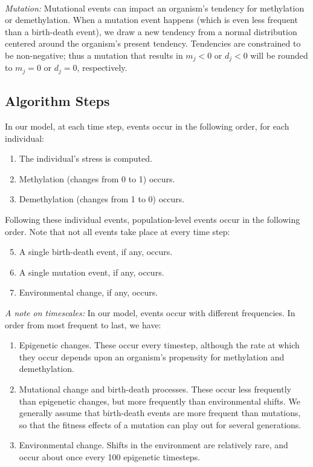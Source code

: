 \documentclass{article}
\begin{document}
\ 

\noindent \textit{Mutation:} Mutational events can impact an organism's tendency for methylation or demethylation. When a mutation event happens (which is even less frequent than a birth-death event), we draw a new tendency from a normal distribution centered around the organism's present tendency. Tendencies are constrained to be non-negative; thus a mutation that results in $m_j<0$ or $d_j<0$ will be rounded to $m_j=0$ or $d_j=0$, respectively.


\subsection{Algorithm Steps}
In our model, at each time step, events occur in the following order, for each individual:
\begin{enumerate}
    \item The individual's stress is computed.
    \item Methylation (changes from 0 to 1) occurs.
    \item Demethylation (changes from 1 to 0) occurs.
\end{enumerate}

Following these individual events, population-level events occur in the following order. Note that not all events take place at every time step:
\begin{enumerate}
  \setcounter{enumi}{4}
    \item A single birth-death event, if any, occurs.
    \item A single mutation event, if any, occurs.
    \item Environmental change, if any, occurs.
\end{enumerate}

\textit{A note on timescales:} In our model, events occur with different frequencies. In order from most frequent to last, we have:
\begin{enumerate}
    \item Epigenetic changes. These occur every timestep, although the rate at which they occur depends upon an organism's propensity for methylation and demethylation.

    \item Mutational change and birth-death processes. These occur less frequently than epigenetic changes, but more frequently than environmental shifts. We generally assume that birth-death events are more frequent than mutations, so that the fitness effects of a mutation can play out for several generations.

    \item Environmental change. Shifts in the environment are relatively rare, and occur about once every 100 epigenetic timesteps. 
\end{enumerate}
\end{document}
